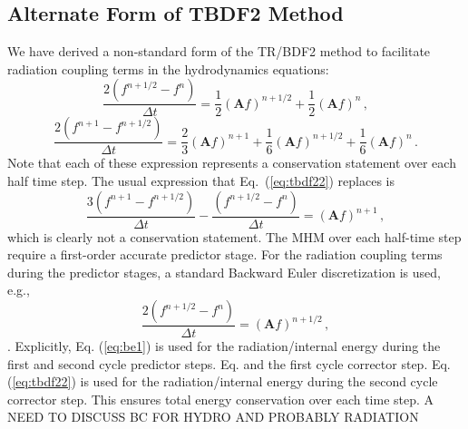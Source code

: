 \documentclass[preprint,12pt]{elsarticle}
\newcommand{\fn}[1]{\left( #1 \right)}
\newcommand{\be}{\begin{equation}}
\newcommand{\ee}{\end{equation}}
\newcommand{\pec}{\, ,}
\newcommand{\pep}{\, .}
\newcommand{\lequ}[1]{\label{eq:#1}}
\newcommand{\equ}[1]{Eq.~(\ref{eq:#1})}
\newcommand{\requ}[1]{(\ref{eq:#1})}
\newcommand{\half}{\frac{1}{2}}
\newcommand{\mA}{\mathbf{A}}
\begin{document}
\subsection{Alternate Form of TBDF2 Method}
\label{sec:Alternate}
  We have derived a non-standard form of the TR/BDF2
method to facilitate radiation coupling terms in the hydrodynamics equations:
\be
\frac{2\fn{f^{n+1/2}-f^{n}}}{\Delta t} = \half (\mA f)^{n+1/2} + \half (\mA f)^{n} \pec
\lequ{tbdf21}
\ee
\be
\frac{2\fn{f^{n+1}-f^{n+1/2}}}{\Delta t} = 
\frac{2}{3} (\mA f)^{n+1} + \frac{1}{6} (\mA f)^{n+1/2} + \frac{1}{6} (\mA f)^{n} \pep
\lequ{tbdf22}
\ee
Note that each of these expression represents a conservation statement over each half time step.  
The usual expression that \equ{tbdf22} replaces is
\be
\frac{3\fn{f^{n+1}-f^{n+1/2}}}{\Delta t} - \frac{\fn{f^{n+1/2}-f^{n}}}{\Delta t}   = 
(\mA f)^{n+1} \pec
\lequ{tbdf23}
\ee
which is clearly not a conservation statement. The MHM over each half-time step require a first-order accurate predictor stage. For the radiation coupling terms during
the predictor stages, a standard Backward Euler discretization is used, e.g.,
\be
\frac{2\fn{f^{n+1/2}-f^{n}}}{\Delta t} = (\mA f)^{n+1/2} \pec
\lequ{be1}
\ee.
Explicitly, Eq. \requ{be1} is used for the radiation/internal energy during the first and second 
cycle predictor steps.  Eq. and the first cycle corrector step.  Eq. \requ{tbdf22} is used for the radiation/internal energy during the 
second cycle corrector step.  This ensures total energy conservation over each time step.
A
NEED TO DISCUSS BC FOR HYDRO AND PROBABLY RADIATION 
\end{document}
